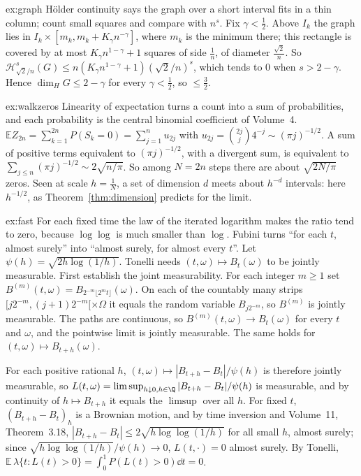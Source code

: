 \begin{solution}{ex:graph}
\idea Hölder continuity says the graph over a short interval fits in a thin column; count small squares and compare with $n^s$.
\writeup Fix $\gamma<\frac12$. Above $I_k$ the graph lies in $I_k\times[m_k,m_k+K_\gamma n^{-\gamma}]$, where $m_k$ is the minimum there; this rectangle is covered by at most $K_\gamma n^{1-\gamma}+1$ squares of side
$\frac1n$, of diameter $\frac{\sqrt2}n$. So $\mathcal H^s_{\sqrt2/n}(G)\le n(K_\gamma n^{1-\gamma}+1)(\sqrt2/n)^s$, which tends to $0$ when $s>2-\gamma$. Hence $\dim_HG\le2-\gamma$ for every $\gamma<\frac12$, so $\le\frac32$.
\end{solution}

\begin{solution}{ex:walkzeros}
\idea Linearity of expectation turns a count into a sum of probabilities, and each probability is the central binomial coefficient of Volume~4.
\writeup $\mathbb E Z_{2n}=\sum_{k=1}^{2n}P(S_k=0)=\sum_{j=1}^nu_{2j}$ with $u_{2j}=\binom{2j}j4^{-j}\sim(\pi j)^{-1/2}$. A sum of positive terms equivalent to $(\pi j)^{-1/2}$, with a divergent sum, is equivalent to
$\sum_{j\le n}(\pi j)^{-1/2}\sim2\sqrt{n/\pi}$. So among $N=2n$ steps there are about $\sqrt{2N/\pi}$ zeros. Seen at scale $h=\frac1N$, a set of dimension $d$ meets about $h^{-d}$ intervals: here $h^{-1/2}$, as
Theorem~\ref{thm:dimension} predicts for the limit.
\end{solution}

\begin{solution}{ex:fast}
\idea For each fixed time the law of the iterated logarithm makes the ratio tend to zero, because $\log\log$ is much smaller than $\log$. Fubini turns ``for each $t$, almost surely'' into ``almost surely, for almost every $t$''.
\writeup Let $\psi(h)=\sqrt{2h\log(1/h)}$. Tonelli needs $(t,\omega)\mapsto B_t(\omega)$ to be jointly measurable. First establish the joint measurability. For each integer $m\ge1$ set
$B^{(m)}(t,\omega)=B_{2^{-m}\lfloor 2^m t\rfloor}(\omega)$. On each of the countably many strips $[j2^{-m},(j+1)2^{-m}[\times\Omega$ it equals the random variable $B_{j2^{-m}}$, so $B^{(m)}$ is jointly
measurable. The paths are continuous, so $B^{(m)}(t,\omega)\to B_t(\omega)$ for every $t$ and $\omega$, and the pointwise limit is jointly measurable. The same holds for $(t,\omega)\mapsto B_{t+h}(\omega)$.

For each positive rational $h$, $(t,\omega)\mapsto|B_{t+h}-B_t|/\psi(h)$ is therefore jointly measurable, so
$L(t,\omega)=\limsup_{h\downarrow0,h\in\Q}|B_{t+h}-B_t|/\psi(h)$ is measurable, and by continuity of $h\mapsto B_{t+h}$ it equals the $\limsup$ over all $h$. For fixed $t$, $(B_{t+h}-B_t)_h$ is a Brownian motion,
and by time inversion and Volume~11, Theorem~3.18, $|B_{t+h}-B_t|\le2\sqrt{h\log\log(1/h)}$ for all small $h$, almost surely; since $\sqrt{h\log\log(1/h)}/\psi(h)\to0$, $L(t,\cdot)=0$ almost surely. By Tonelli,
$\mathbb E\,\lambda\{t:L(t)>0\}=\int_0^1P(L(t)>0)\dd t=0$.
\end{solution}

